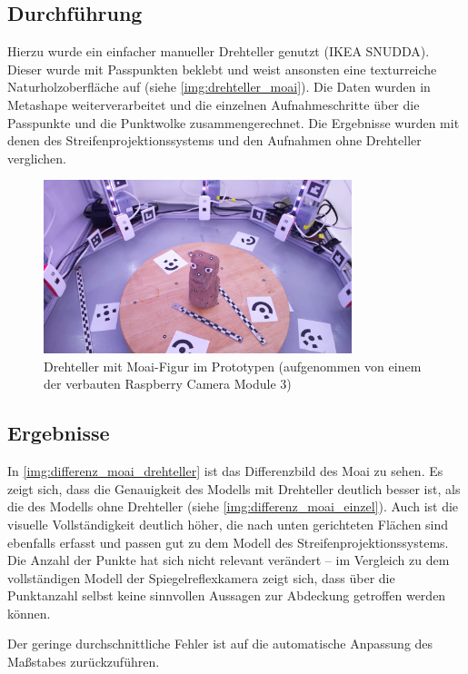 \documentclass[./00PhotoBox.tex]{subfiles}
\begin{document}
\subsection{Durchführung}
Hierzu wurde ein einfacher manueller Drehteller genutzt (IKEA SNUDDA). Dieser wurde mit Passpunkten beklebt und weist ansonsten eine texturreiche Naturholzoberfläche auf (siehe \autoref{img:drehteller_moai}). Die Daten wurden in Metashape weiterverarbeitet und die einzelnen Aufnahmeschritte über die Passpunkte und die Punktwolke zusammengerechnet. Die Ergebnisse wurden mit denen des Streifenprojektionssystems und den Aufnahmen ohne Drehteller verglichen.

\begin{figure}
    \centering
    \includegraphics[width=0.8\textwidth]{img/7_versuche/drehteller_moai.jpg}
    \caption{Drehteller mit Moai-Figur im Prototypen (aufgenommen von einem der verbauten Raspberry Camera Module 3)}
    \label{img:drehteller_moai}
\end{figure}

\subsection{Ergebnisse}

In \autoref{img:differenz_moai_drehteller} ist das Differenzbild des Moai zu sehen. Es zeigt sich, dass die Genauigkeit des Modells mit Drehteller deutlich besser ist, als die des Modells ohne Drehteller (siehe \autoref{img:differenz_moai_einzel}). Auch ist die visuelle Vollständigkeit deutlich höher, die nach unten gerichteten Flächen sind ebenfalls erfasst und passen gut zu dem Modell des Streifenprojektionssystems. Die Anzahl der Punkte hat sich nicht relevant verändert -- im Vergleich zu dem vollständigen Modell der Spiegelreflexkamera zeigt sich, dass über die Punktanzahl selbst keine sinnvollen Aussagen zur Abdeckung getroffen werden können.

Der geringe durchschnittliche Fehler ist auf die au\-to\-ma\-tische Anpassung des Maßstabes zurückzuführen.
\end{document}
